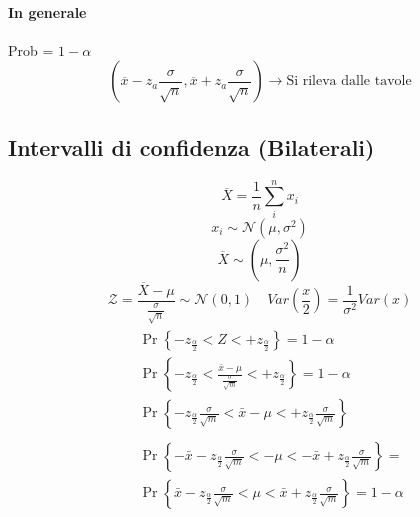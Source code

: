 \documentclass[]{article}
\begin{document}
    \paragraph{In generale} Prob = $1-\alpha$
    \[ (\overline{x} - z_a \frac{\sigma}{\sqrt{n}}, \overline{x} + z_a \frac{\sigma}{\sqrt{n}} ) \rightarrow \text{Si rileva dalle tavole} \]
    \subsection{Intervalli di confidenza (Bilaterali)}
    \[ \overline{X} = \frac{1}{n} \sum_{i}^{n} x_i \]
    \[ x_i \sim \mathcal{N}(\mu, \sigma^2) \]
    \[ \overline{X} \sim(\mu, \frac{\sigma^2}{n}) \]
    \[ \mathcal{Z} = \frac{\overline{X} - \mu}{\frac{\sigma}{\sqrt{n}}} \sim \mathcal{N}(0, 1) \quad Var(\frac{x}{2}) = \frac{1}{\sigma^2} Var(x) \]
    \begin{equation*}
        \begin{aligned}
            &\begin{aligned}
            & \operatorname{Pr}\left\{-z_{\frac{\alpha}{2}}<Z<+z_{\frac{\alpha}{2}}\right\}=1-\alpha \\
            & \operatorname{Pr}\left\{-z_{\frac{\alpha}{2}}<\frac{\bar{x}-\mu}{\frac{\sigma}{\sqrt{m}}}<+z_{\frac{\alpha}{2}}\right\}=1-\alpha \\
                & \operatorname{Pr}\left\{-z_{\frac{\alpha}{2}} \frac{\sigma}{\sqrt{m}}<\bar{x}-\mu<+z_{\frac{\alpha}{2}} \frac{\sigma}{\sqrt{m}}\right\}
        \end{aligned}\\
        &\begin{aligned}
        & \operatorname{Pr}\left\{-\bar{x}-z_{\frac{\alpha}{2}} \frac{\sigma}{\sqrt{m}}<-\mu<-\bar{x}+z_{\frac{\alpha}{2}} \frac{\sigma}{\sqrt{m}}\right\}= \\
        & \operatorname{Pr}\left\{\bar{x}-z_{\frac{\alpha}{2}} \frac{\sigma}{\sqrt{m}}<\mu<\bar{x}+z_{\frac{\alpha}{2}} \frac{\sigma}{\sqrt{m}}\right\}=1-\alpha
        \end{aligned}
        \end{aligned}
    \end{equation*}
\end{document}
